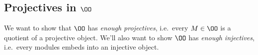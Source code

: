 \begin{center}
  \begin{wideeq}
\end{wideeq}
  \end{center}

\hypertarget{projectives-in-oo}{%
\subsection{\texorpdfstring{Projectives in
\(\OO\)}{Projectives in \textbackslash OO}}\label{projectives-in-oo}}

We want to show that \(\OO\) has \emph{enough projectives}, i.e.~every
\(M\in \OO\) is a quotient of a projective object. We'll also want to
show \(\OO\) has \emph{enough injectives}, i.e.~every modules embeds
into an injective object.

